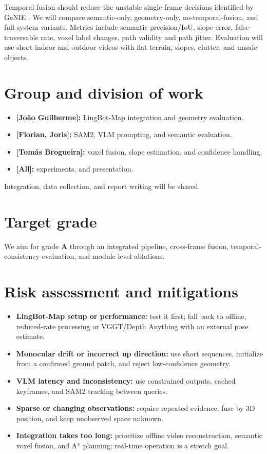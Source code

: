 \documentclass[11pt,a4paper]{article}
\begin{document}
Temporal fusion should reduce the unstable single-frame decisions identified by GeNIE \cite{wang_genie_2025}. We will compare semantic-only, geometry-only, no-temporal-fusion, and full-system variants. Metrics include semantic precision/IoU, slope error, false-traversable rate, voxel label changes, path validity and path jitter. Evaluation will use short indoor and outdoor videos with flat terrain, slopes, clutter, and unsafe objects.

\section{Group and division of work}

\begin{itemize}
    \item \textbf{[João Guilherme]:} LingBot-Map integration and geometry evaluation.
    \item \textbf{[Florian, Joris]:} SAM2, VLM prompting, and semantic evaluation.
    \item \textbf{[Tomás Brogueira]:} voxel fusion, slope estimation, and confidence handling.
    \item \textbf{[All]:} experiments, and presentation.
\end{itemize}

Integration, data collection, and report writing will be shared.

\section{Target grade}

We aim for grade \textbf{A} through an integrated pipeline, cross-frame fusion, temporal-consistency evaluation, and module-level ablations.

\section{Risk assessment and mitigations}

\begin{itemize}
    \item \textbf{LingBot-Map setup or performance:} test it first; fall back to offline, reduced-rate processing or VGGT/Depth Anything with an external pose estimate.
    \item \textbf{Monocular drift or incorrect up direction:} use short sequences, initialize from a confirmed ground patch, and reject low-confidence geometry.
    \item \textbf{VLM latency and inconsistency:} use constrained outputs, cached keyframes, and SAM2 tracking between queries.
    \item \textbf{Sparse or changing observations:} require repeated evidence, fuse by 3D position, and keep unobserved space unknown.
    \item \textbf{Integration takes too long:} prioritize offline video reconstruction, semantic voxel fusion, and A* planning; real-time operation is a stretch goal.
\end{itemize}
\end{document}
